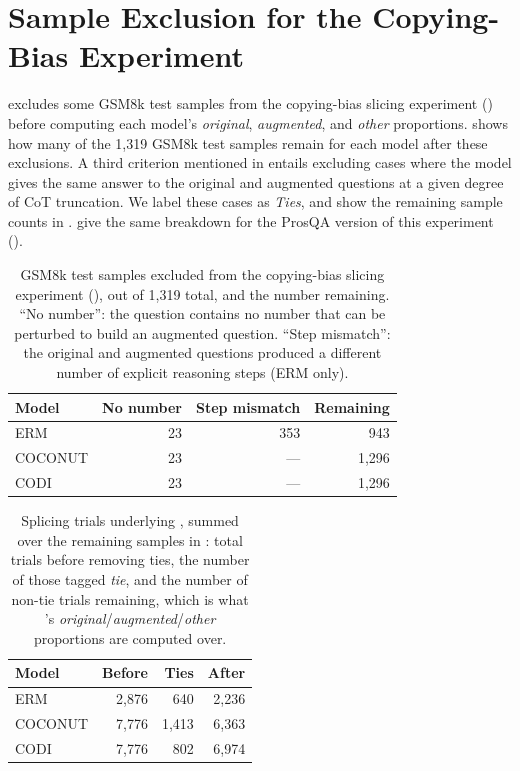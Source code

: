\documentclass[11pt]{article}
\begin{document}
\section{Sample Exclusion for the Copying-Bias Experiment}
\label{sec:appendix-exclusion}

 excludes some GSM8k test samples from the copying-bias slicing experiment () before computing each model's \emph{original}, \emph{augmented}, and \emph{other} proportions.  shows how many of the 1,319 GSM8k test samples remain for each model after these exclusions. A third criterion mentioned in  entails excluding cases where the model gives the same answer to the original and augmented questions at a given degree of CoT truncation. We label these cases as \emph{Ties}, and show the remaining sample counts in .  give the same breakdown for the ProsQA version of this experiment ().

\begin{table}[h]
\centering
\small
\begin{tabular}{lrrr}
\toprule
Model & No number & Step mismatch & Remaining \\
\midrule
ERM      & 23 & 353 & 943 \\
COCONUT  & 23 & --- & 1{,}296 \\
CODI     & 23 & --- & 1{,}296 \\
\bottomrule
\end{tabular}
\caption{GSM8k test samples excluded from the copying-bias slicing experiment (), out of 1,319 total, and the number remaining. ``No number'': the question contains no number that can be perturbed to build an augmented question. ``Step mismatch'': the original and augmented questions produced a different number of explicit reasoning steps (ERM only).}
\label{tab:exclusion}
\end{table}

\begin{table}[h]
\centering
\small
\begin{tabular}{lrrr}
\toprule
Model & Before & Ties & After \\
\midrule
ERM      & 2{,}876 & 640   & 2{,}236 \\
COCONUT  & 7{,}776 & 1{,}413 & 6{,}363 \\
CODI     & 7{,}776 & 802   & 6{,}974 \\
\bottomrule
\end{tabular}
\caption{Splicing trials underlying , summed over the remaining samples in : total trials before removing ties, the number of those tagged \emph{tie}, and the number of non-tie trials remaining, which is what 's \emph{original}/\emph{augmented}/\emph{other} proportions are computed over.}
\label{tab:exclusion-trials}
\end{table}
\end{document}
